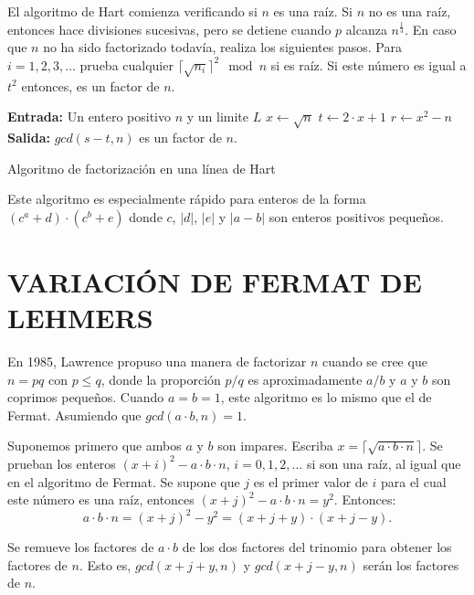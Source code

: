     El algoritmo de Hart comienza verificando si $n$ es una raíz. Si $n$ no es una raíz, entonces hace divisiones sucesivas, pero se detiene cuando $p$ alcanza $n^{\frac{1}{3}}$. En caso que $n$ no ha sido factorizado todavía, realiza los siguientes pasos.
    Para $i=1, 2, 3, \dots $ prueba cualquier $\lceil\sqrt{n_{i}}\rceil^{2} \mod n$ si es raíz. Si este número es igual a $t^{2}$ entonces, es un factor de $n$. \citep{Hart2012}


    \begin{algorithm}[H]
        \SetAlgoLined
        \textbf{Entrada:} Un entero positivo $n$ y un limite $L$ \;
        $x \leftarrow \sqrt{n}$\;
        $t \leftarrow 2\cdot x + 1$\;
        $r \leftarrow x^{2} - n $\;
        \textbf{Salida:} $gcd(s-t, n)$ es un factor de $n$.\ 
        \caption{Algoritmo de factorización en una línea de Hart}
    \end{algorithm}

    Este algoritmo es especialmente rápido para enteros de la forma $(c^{a} + d)\cdot (c^{b} + e)$ donde $c$, $|d|$, $|e|$ y $|a-b|$ son enteros positivos pequeños.

    \section{VARIACIÓN DE FERMAT DE LEHMERS}
    En 1985, Lawrence propuso una manera de factorizar $n$ cuando se cree que $n=pq$ con $p \leq q$, donde la proporción $p/q$ es aproximadamente $a/b$ y $a$ y $b$ son coprimos pequeños. Cuando $a=b=1$, este algoritmo es lo mismo que el de Fermat. Asumiendo que $gcd(a\cdot b, n) = 1$.
    
    Suponemos primero que ambos $a$ y $b$ son impares. Escriba $x=\lceil\sqrt{a\cdot b \cdot n}\rceil$. Se prueban los enteros $(x+i)^{2} - a\cdot b \cdot n$, $i=0, 1, 2, \dots$ si son una raíz, al igual que en el algoritmo de Fermat. Se supone que $j$ es el primer valor de $i$ para el cual este número es una raíz, entonces $(x + j)^{2} - a \cdot b \cdot n = y^{2}$.
    Entonces:
    \[
        a \cdot b \cdot n = (x + j)^{2} - y^{2} = (x + j +y)\cdot(x + j - y).
    \]

    Se remueve los factores de $a\cdot b$ de los dos factores del trinomio para obtener los factores de $n$. Esto es, $gcd(x + j + y, n)$ y $gcd(x + j - y, n)$ serán los factores de $n$.

